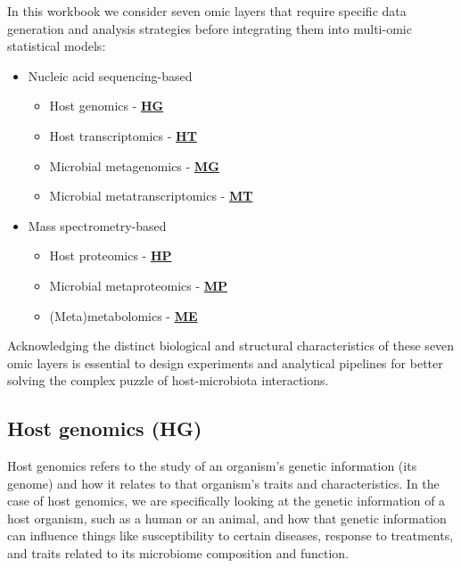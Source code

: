 \documentclass[
]{book}
\providecommand{\tightlist}{%
  \setlength{\itemsep}{0pt}\setlength{\parskip}{0pt}}
\begin{document}
In this workbook we consider seven omic layers that require specific data generation and analysis strategies before integrating them into multi-omic statistical models:

\begin{itemize}
\tightlist
\item
  Nucleic acid sequencing-based

  \begin{itemize}
  \tightlist
  \item
    Host genomics - \textbf{\protect\hyperlink{host-genomics}{HG}}
  \item
    Host transcriptomics - \textbf{\protect\hyperlink{host-transcriptomics}{HT}}
  \item
    Microbial metagenomics - \textbf{\protect\hyperlink{microbial-metagenomics}{MG}}
  \item
    Microbial metatranscriptomics - \textbf{\protect\hyperlink{microbial-metatranscriptomics}{MT}}
  \end{itemize}
\item
  Mass spectrometry-based

  \begin{itemize}
  \tightlist
  \item
    Host proteomics - \textbf{\protect\hyperlink{host-proteomics}{HP}}
  \item
    Microbial metaproteomics - \textbf{\protect\hyperlink{microbial-metaproteomics}{MP}}
  \item
    (Meta)metabolomics - \textbf{\protect\hyperlink{meta-metabolomics}{ME}}
  \end{itemize}
\end{itemize}

Acknowledging the distinct biological and structural characteristics of these seven omic layers is essential to design experiments and analytical pipelines for better solving the complex puzzle of host-microbiota interactions.

\hypertarget{host-genomics}{%
\subsection*{Host genomics (HG)}\label{host-genomics}}

Host genomics refers to the study of an organism's genetic information (its genome) and how it relates to that organism's traits and characteristics. In the case of host genomics, we are specifically looking at the genetic information of a host organism, such as a human or an animal, and how that genetic information can influence things like susceptibility to certain diseases, response to treatments, and traits related to its microbiome composition and function.
\end{document}
